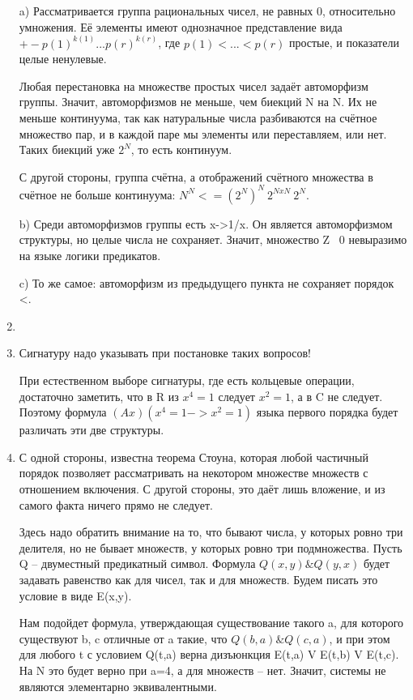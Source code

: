 \documentclass[11pt]{article}
\begin{document}
\begin{enumerate}
		a) Рассматривается группа рациональных чисел, не равных 0, относительно умножения. Её элементы имеют однозначное представление вида $+-p(1)^{k(1)}...p(r)^{k(r)}$, где $p(1) < ... < p(r)$ простые, и показатели целые ненулевые.
		
		Любая перестановка на множестве простых чисел задаёт автоморфизм группы. Значит, автоморфизмов не меньше, чем биекций N на N. Их не меньше континуума, так как натуральные числа разбиваются на счётное множество пар, и в каждой паре мы элементы или переставляем, или нет. Таких биекций уже $2^N$, то есть континуум.
		
		С другой стороны, группа счётна, а отображений счётного множества в счётное не больше континуума: $N^N<=(2^N)^N~2^{NxN}~2^N$.
		
		b) Среди автоморфизмов группы есть x->1/x. Он является автоморфизмом структуры, но целые числа не сохраняет. Значит, множество Z \ {0} невыразимо на языке логики предикатов.
		
		c) То же самое: автоморфизм из предыдущего пункта не сохраняет порядок <.
		
		
		\item  
		\item Сигнатуру надо указывать при постановке таких вопросов!
		
		При естественном выборе сигнатуры, где есть кольцевые операции, достаточно заметить, что в R из $x^4=1$ следует $x^2=1$, а в C не следует. Поэтому формула $(Ax)(x^4=1 -> x^2=1)$ языка первого порядка будет различать эти две структуры.
		\item 
		
		С одной стороны, известна теорема Стоуна, которая любой частичный порядок позволяет рассматривать на некотором множестве множеств с отношением включения. С другой стороны, это даёт лишь вложение, и из самого факта ничего прямо не следует.
		
		Здесь надо обратить внимание на то, что бывают числа, у которых ровно три делителя, но не бывает множеств, у которых ровно три подмножества. Пусть Q -- двуместный предикатный символ. Формула $Q(x,y) \& Q(y,x)$ будет задавать равенство как для чисел, так и для множеств. Будем писать это условие в виде E(x,y).
		
		Нам подойдет формула, утверждающая существование такого a, для которого существуют b, c отличные от a такие, что $Q(b,a) \& Q(c,a)$, и при этом для любого t с условием Q(t,a) верна дизъюнкция E(t,a) V E(t,b) V E(t,c). На N это будет верно при a=4, а для множеств -- нет. Значит, системы не являются элементарно эквивалентными.
		
		
	\end{enumerate}
\end{document}
